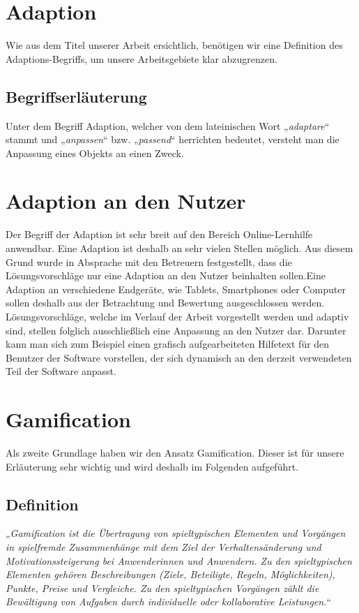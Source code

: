\section{Adaption}
\label{ch:Content1}
Wie aus dem Titel unserer Arbeit ersichtlich, benötigen wir eine Definition des Adaptions-Begriffs, um unsere Arbeitsgebiete klar abzugrenzen.

\subsection{Begriffserläuterung}
Unter dem Begriff Adaption, welcher von dem lateinischen Wort „\textit{adaptare}“ stammt und „\textit{anpassen}“ bzw. „\textit{passend}“ herrichten \cite{dud3} bedeutet, versteht man die Anpassung eines Objekts an einen Zweck. 

\section{Adaption an den Nutzer}
Der Begriff der Adaption ist sehr breit auf den Bereich Online-Lernhilfe anwendbar. Eine Adaption ist deshalb an sehr vielen Stellen möglich. Aus diesem Grund wurde in Absprache mit den Betreuern festgestellt, dass die Lösungsvorschläge nur eine Adaption an den Nutzer beinhalten sollen.Eine Adaption an verschiedene Endgeräte, wie Tablets, Smartphones oder Computer sollen deshalb aus der Betrachtung und Bewertung ausgeschlossen werden. Lösungsvorschläge, welche im Verlauf der Arbeit vorgestellt werden und adaptiv sind, stellen folglich ausschließlich eine Anpassung an den Nutzer dar. Darunter kann man sich zum Beispiel einen grafisch aufgearbeiteten Hilfetext für den Benutzer der Software vorstellen, der sich dynamisch an den derzeit verwendeten Teil der Software anpasst.

\section{Gamification}
Als zweite Grundlage haben wir den Ansatz Gamification. Dieser ist für unsere Erläuterung sehr wichtig und wird deshalb im Folgenden aufgeführt.
\subsection{Definition}
„\textit{Gamification ist die Übertragung von spieltypischen Elementen und Vorgängen in spielfremde Zusammenhänge mit dem Ziel der Verhaltensänderung und Motivationssteigerung bei Anwenderinnen und Anwendern. Zu den spieltypischen Elementen gehören Beschreibungen (Ziele, Beteiligte, Regeln, Möglichkeiten), Punkte, Preise und Vergleiche. Zu den spieltypischen Vorgängen zählt die Bewältigung von Aufgaben durch individuelle oder kollaborative Leistungen.}“ \cite{gamification}

